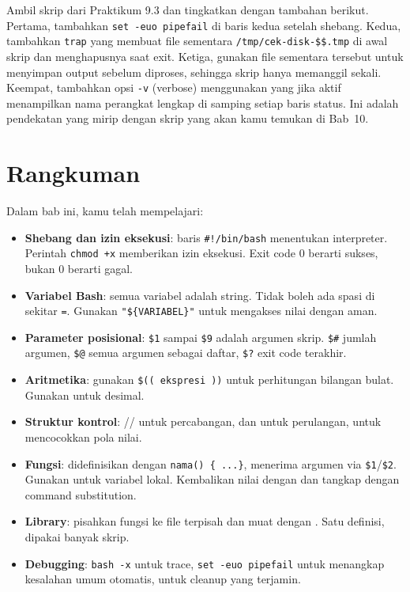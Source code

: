 \begin{challengebox}
Ambil skrip  dari Praktikum 9.3 dan tingkatkan dengan
tambahan berikut. Pertama, tambahkan \texttt{set -euo pipefail} di baris
kedua setelah shebang. Kedua, tambahkan \texttt{trap} yang membuat file
sementara \texttt{/tmp/cek-disk-\$\$.tmp} di awal skrip dan menghapusnya
saat exit. Ketiga, gunakan file sementara tersebut untuk menyimpan output
 sebelum diproses, sehingga skrip hanya memanggil  sekali.
Keempat, tambahkan opsi \texttt{-v} (verbose) menggunakan 
yang jika aktif menampilkan nama perangkat lengkap di samping setiap baris
status. Ini adalah pendekatan yang mirip dengan skrip 
yang akan kamu temukan di Bab~10.
\end{challengebox}

\section{Rangkuman}
\label{sec:rangkuman-bash-programming}

Dalam bab ini, kamu telah mempelajari:

\begin{itemize}[noitemsep,topsep=2pt]
    \item \textbf{Shebang dan izin eksekusi}: baris \texttt{\#!/bin/bash}
          menentukan interpreter. Perintah \texttt{chmod +x} memberikan
          izin eksekusi. Exit code 0 berarti sukses, bukan 0 berarti
          gagal.
    \item \textbf{Variabel Bash}: semua variabel adalah string. Tidak
          boleh ada spasi di sekitar \texttt{=}. Gunakan
          \texttt{"\$\{VARIABEL\}"} untuk mengakses nilai dengan aman.
    \item \textbf{Parameter posisional}: \texttt{\$1} sampai \texttt{\$9}
          adalah argumen skrip. \texttt{\$\#} jumlah argumen, \texttt{\$@}
          semua argumen sebagai daftar, \texttt{\$?} exit code terakhir.
    \item \textbf{Aritmetika}: gunakan \texttt{\$(( ekspresi ))} untuk
          perhitungan bilangan bulat. Gunakan  untuk desimal.
    \item \textbf{Struktur kontrol}: // untuk
          percabangan,  dan  untuk perulangan,
           untuk mencocokkan pola nilai.
    \item \textbf{Fungsi}: didefinisikan dengan \texttt{nama() \{ ...\}},
          menerima argumen via \texttt{\$1}/\texttt{\$2}. Gunakan
           untuk variabel lokal. Kembalikan nilai dengan
           dan tangkap dengan command substitution.
    \item \textbf{Library}: pisahkan fungsi ke file terpisah dan muat
          dengan . Satu definisi, dipakai banyak skrip.
    \item \textbf{Debugging}: \texttt{bash -x} untuk trace, \texttt{set
          -euo pipefail} untuk menangkap kesalahan umum otomatis,
           untuk cleanup yang terjamin.
\end{itemize}

